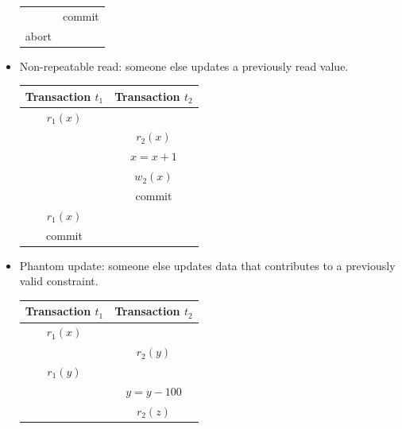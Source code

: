 \documentclass[12pt, a4paper]{report}
\begin{document}
\begin{itemize}
\begin{table}[H]
\begin{tabular}{c|c}
                                        & commit                     \\
                abort                      &                           
                \end{tabular}
            \end{table}
        \item Non-repeatable read: someone else updates a previously read value.
            \begin{table}[H]
                \centering
                \begin{tabular}{c|c}
                \textbf{Transaction $t_1$}  & \textbf{Transaction $t_2$} \\ \hline
                $r_1(x)$                    &                            \\
                                            & $r_2(x)$                   \\
                                            & $x=x+1$                    \\
                                            & $w_2(x)$                   \\
                                            & commit                     \\
                $r_1(x)$                    &                            \\
                commit                      & \multicolumn{1}{l}{}      
                \end{tabular}
            \end{table}
        \item Phantom update: someone else updates data that contributes to a previously valid constraint. 
            \begin{table}[H]
                \centering
                \begin{tabular}{c|c}
                \textbf{Transaction $t_1$} & \textbf{Transaction $t_2$} \\ \hline
                $r_1(x)$                   &                            \\
                                           & $r_2(y)$                   \\
                $r_1(y)$                   &                            \\
                                           & $y=y-100$                  \\
                                           & $r_2(z)$                   \\

\end{tabular}
\end{table}
\end{itemize}
\end{document}
